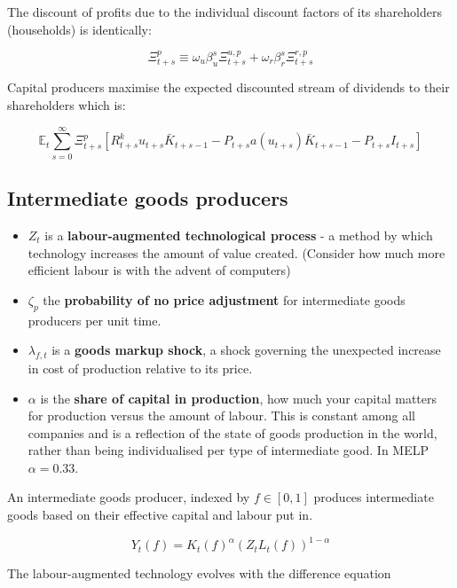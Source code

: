 \documentclass[notitlepage,12pt]{report}
\begin{document}
\begin{appendices}
	The discount of profits due to the individual discount factors of its shareholders (households) is identically:
	
	\begin{equation}
	\Xi_{t+s}^p\equiv\omega_u\beta_u^s\Xi_{t+s}^{u,p}+\omega_r\beta_r^s\Xi_{t+s}^{r,p}
	\end{equation}
	
	Capital producers maximise the expected discounted stream of dividends to their shareholders which is:
	
	\begin{equation}
	\mathbb{E}_t \sum_{s=0}^\infty\Xi_{t+s}^p\left[R_{t+s}^k u_{t+s} \bar{K}_{t+s-1}-P_{t+s}a\left(u_{t+s}\right)\bar{K}_{t+s-1}-P_{t+s}I_{t+s}\right]
	\end{equation}
	
	\subsection{Intermediate goods producers}
	
	\begin{itemize}
		\item \(Z_t\) is a {\bf labour-augmented technological process} - a method by which technology increases the amount of value created. (Consider how much more efficient labour is with the advent of computers)
		\item \(\zeta_p\) the {\bf probability of no price adjustment} for intermediate goods producers per unit time.
		\item \(\lambda_{f,t}\) is a {\bf goods markup shock}, a shock governing the unexpected increase in cost of production relative to its price.
		\item \(\alpha\) is the {\bf share of capital in production}, how much your capital matters for production versus the amount of labour. This is constant among all companies and is a reflection of the state of goods production in the world, rather than being individualised per type of intermediate good. In MELP \(\alpha=0.33\).
	\end{itemize}
	
	An intermediate goods producer, indexed by \(f\in[0,1]\) produces intermediate goods based on their effective capital and labour put in.
	
	\begin{equation}
	Y_t(f)=K_t(f)^\alpha(Z_tL_t(f))^{1-\alpha}
	\end{equation}
	
	The labour-augmented technology evolves with the difference equation
	

\end{appendices}
\end{document}
